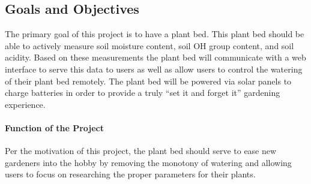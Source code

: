 \subsection{Goals and Objectives}
The primary goal of this project is to have a plant bed. This plant bed should be able to actively measure soil moisture content, soil OH group content, and soil acidity. Based on these measurements the plant bed will communicate with a web interface to serve this data to users as well as allow users to control the watering of their plant bed remotely. The plant bed will be powered via solar panels to charge batteries in order to provide a truly ``set it and forget it'' gardening experience.

\paragraph{Function of the Project} Per the motivation of this project, the plant bed should serve to ease new gardeners into the hobby by removing the monotony of watering and allowing users to focus on researching the proper parameters for their plants.
